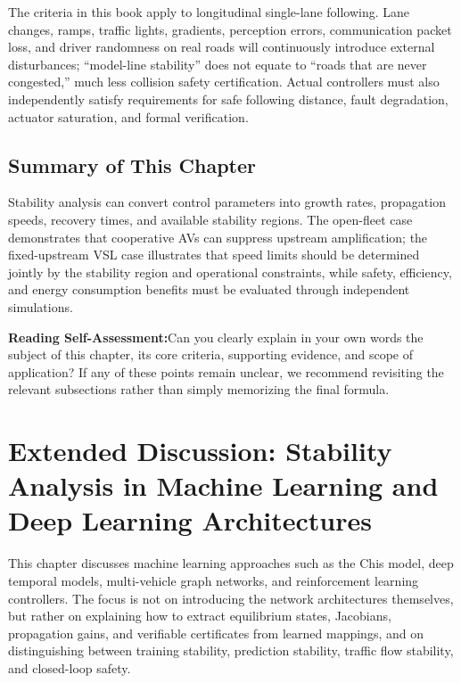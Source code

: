 \documentclass[11pt,a4paper,openany]{book}
\numberwithin{equation}{chapter}
\numberwithin{figure}{chapter}
\numberwithin{table}{chapter}
\newcommand{\sectionwrapup}[1]{%
  \section{Summary of This Chapter}
  \begin{tcolorbox}[summarybox,title=\textbf{Chapter Review}]
  #1
  \par\smallskip
  \textbf{Reading Self-Assessment:}Can you clearly explain in your own words the subject of this chapter, its core criteria, supporting evidence, and scope of application? If any of these points remain unclear, we recommend revisiting the relevant subsections rather than simply memorizing the final formula.
\end{tcolorbox}
  \clearpage
}
\newcommand{\chapterguide}[2]{%
  \begin{tcolorbox}[chapterguide,title=\textbf{Chapter Guide: #1}]
  #2
  \end{tcolorbox}}
\begin{document}
\begin{tcolorbox}[notebox,title=\textbf{Application Boundaries}]

The criteria in this book apply to longitudinal single-lane following. Lane changes, ramps, traffic lights, gradients, perception errors, communication packet loss, and driver randomness on real roads will continuously introduce external disturbances; “model-line stability” does not equate to “roads that are never congested,” much less collision safety certification. Actual controllers must also independently satisfy requirements for safe following distance, fault degradation, actuator saturation, and formal verification.







\end{tcolorbox}

\sectionwrapup{Stability analysis can convert control parameters into growth rates, propagation speeds, recovery times, and available stability regions. The open-fleet case demonstrates that cooperative AVs can suppress upstream amplification; the fixed-upstream VSL case illustrates that speed limits should be determined jointly by the stability region and operational constraints, while safety, efficiency, and energy consumption benefits must be evaluated through independent simulations.}

\chapter{Extended Discussion: Stability Analysis in Machine Learning and Deep Learning Architectures}
\label{sec:ml-stability}
\chapterguide{How Learning Models Can Be Reintegrated into Classical Stability Theory}{This chapter discusses machine learning approaches such as the Chis model, deep temporal models, multi-vehicle graph networks, and reinforcement learning controllers. The focus is not on introducing the network architectures themselves, but rather on explaining how to extract equilibrium states, Jacobians, propagation gains, and verifiable certificates from learned mappings, and on distinguishing between training stability, prediction stability, traffic flow stability, and closed-loop safety.
}
\end{document}
